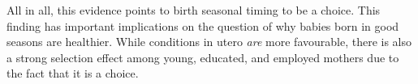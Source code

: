 \documentclass[a4paper, 11.5 pt]{article}
\theoremstyle{plain}
\begin{document}
\begin{doublespace}
All in all, this evidence points to birth seasonal timing to be a choice. This finding has important implications on the question of why babies born in good seasons are healthier.  While conditions in utero \emph{are} more favourable, there is also a strong selection effect among young, educated, and employed mothers due to the fact that it is a choice.


\newpage


\end{doublespace}
\end{document}
